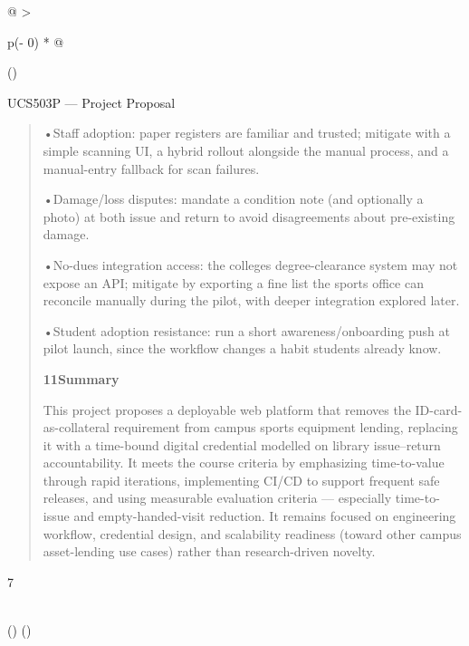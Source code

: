 \documentclass[
]{article}
\begin{document}
\begin{longtable}[]{@{}
  >{\raggedright\arraybackslash}p{(\columnwidth - 0\tabcolsep) * }@{}}
\toprule()
\begin{minipage}[b]{\linewidth}\raggedright
UCS503P --- Project Proposal

\begin{quote}
•Staff adoption: paper registers are familiar and trusted; mitigate with
a simple scanning UI, a hybrid rollout alongside the manual process, and
a manual-entry fallback for scan failures.

•Damage/loss disputes: mandate a condition note (and optionally a photo)
at both issue and return to avoid disagreements about pre-existing
damage.

•No-dues integration access: the college\textquotesingle s
degree-clearance system may not expose an API; mitigate by exporting a
fine list the sports office can reconcile manually during the pilot,
with deeper integration explored later.

•Student adoption resistance: run a short awareness/onboarding push at
pilot launch, since the workflow changes a habit students already know.

\textbf{11Summary}

This project proposes a deployable web platform that removes the
ID-card-as-collateral requirement from campus sports equipment lending,
replacing it with a time-bound digital credential modelled on library
issue--return accountability. It meets the course criteria by
emphasizing time-to-value through rapid iterations, implementing CI/CD
to support frequent safe releases, and using measurable evaluation
criteria --- especially time-to-issue and empty-handed-visit reduction.
It remains focused on engineering workflow, credential design, and
scalability readiness (toward other campus asset-lending use cases)
rather than research-driven novelty.
\end{quote}

7
\end{minipage} \\
\midrule()
\endhead
\bottomrule()
\end{longtable}
\end{document}
